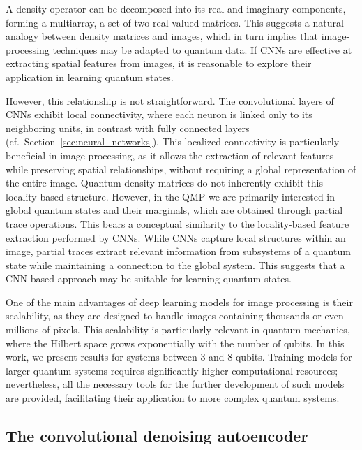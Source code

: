 A density operator can be decomposed into its real and imaginary components, forming a multiarray, a set of two real-valued matrices. This suggests a natural analogy between density matrices and images, which in turn implies that image-processing techniques may be adapted to quantum data. If CNNs are effective at extracting spatial features from images, it is reasonable to explore their application in learning quantum states.

However, this relationship is not straightforward. The convolutional layers of CNNs exhibit local connectivity, where each neuron is linked only to its neighboring units, in contrast with fully connected layers (cf.~Section~\ref{sec:neural_networks}). This localized connectivity is particularly beneficial in image processing, as it allows the extraction of relevant features while preserving spatial relationships, without requiring a global representation of the entire image. Quantum density matrices do not inherently exhibit this locality-based structure. However, in the QMP we are primarily interested in global quantum states and their marginals, which are obtained through partial trace operations. This bears a conceptual similarity to the locality-based feature extraction performed by CNNs. While CNNs capture local structures within an image, partial traces extract relevant information from subsystems of a quantum state while maintaining a connection to the global system. This suggests that a CNN-based approach may be suitable for learning quantum states.

One of the main advantages of deep learning models for image processing is their scalability, as they are designed to handle images containing thousands or even millions of pixels. This scalability is particularly relevant in quantum mechanics, where the Hilbert space grows exponentially with the number of qubits. In this work, we present results for systems between 3 and 8 qubits. Training models for larger quantum systems requires significantly higher computational resources; nevertheless, all the necessary tools for the further development of such models are provided, facilitating their application to more complex quantum systems.

\subsection{The convolutional denoising autoencoder}
\label{sec:qmp-cdae}

